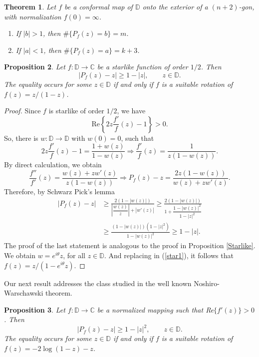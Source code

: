 \documentclass[reqno]{amsart}
\theoremstyle{plain}
\newtheorem{theo}{Theorem}[section]
\newtheorem{prop}[theo]{Proposition}
\theoremstyle{definition}
\newcommand{\C}{\mathbb{C}}
\newcommand{\D}{\mathbb{D}}
\begin{document}
\begin{theo}
 Let $f$ be a conformal map of $\D$ onto the exterior of a $(n+2)$-gon, with normalization $f(0) =\infty$.
 \begin{enumerate} [wide]
     \item [$(i)$] If $|b|>1$, then $\#\{P_f(z)=b\}=m$.
     \item [$(ii)$] If $|a|<1$, then $\#\{P_f(z)=a\}=k+3$.
 \end{enumerate}
 \end{theo}

\begin{prop} Let $f:\D\to\C$ be a starlike function of order $1/2$. Then 
\begin{equation}
|P_f(z)-z|\geq 1-|z|,\qquad z\in\D.
\end{equation}
The equality occurs for some $z\in\D$ if and only if $f$ is a suitable rotation of $f(z)=z/(1-z)$.
\end{prop}
\begin{proof}
    Since $f$ is starlike of order $1/2$, we have
\[\text{Re}\left\{2z\frac{f'}{f}(z)-1\right\}>0.\]
So, there is $w:\D \to \D$ with $w(0)=0$, such that
\begin{equation}\label{star1}
   2z\frac{f'}{f}(z)-1=\frac{1+w(z)}{1-w(z)}\Rightarrow \frac{f'}{f}(z)=\frac{1}{z(1-w(z))}. 
\end{equation}
By direct calculation, we obtain
\[\frac{f''}{f'}(z)=\frac{w(z)+zw'(z)}{z(1-w(z))}\Rightarrow P_f(z)-z=\frac{2z(1-w(z))}{w(z)+zw'(z)}.\]
Therefore, by Schwarz Pick's lemma
\begin{align}
 |P_f(z)-z|&\geq \frac{2(1-|w(z)|)}{\left|\dfrac{w(z)}{z}\right|+|w'(z)|}\geq \frac{2(1-|w(z)|)}{1+\dfrac{1-|w(z)|^2}{1-|z|^2}}\\
 & \geq \frac{(1-|w(z)|)(1-|z|^2)}{1-|w(z)|^2}\geq 1-|z|.
\end{align}
The proof of the last statement is analogous to the proof in Proposition \ref{Starlike}. We obtain $w=e^{i\theta}z$, for all $z\in \D$. And replacing in (\ref{star1}), it follows that $f(z)=z/(1-e^{i\theta}z).$
\end{proof}

Our next result addresses the class studied in the well known Noshiro-Warschawski theorem. 

\begin{prop} Let $f:\D\to\C$ be a normalized mapping such that {\rm Re}$\{f'(z)\}>0$. Then 
\begin{equation}\label{N}
|P_f(z)-z|\geq 1-|z|^2,\qquad z\in\D.
\end{equation}
The equality occurs for some $z\in\D$ if and only if $f$ is a suitable rotation of $f(z)=-2\log(1-z)-z$.
\end{prop}
\end{document}
